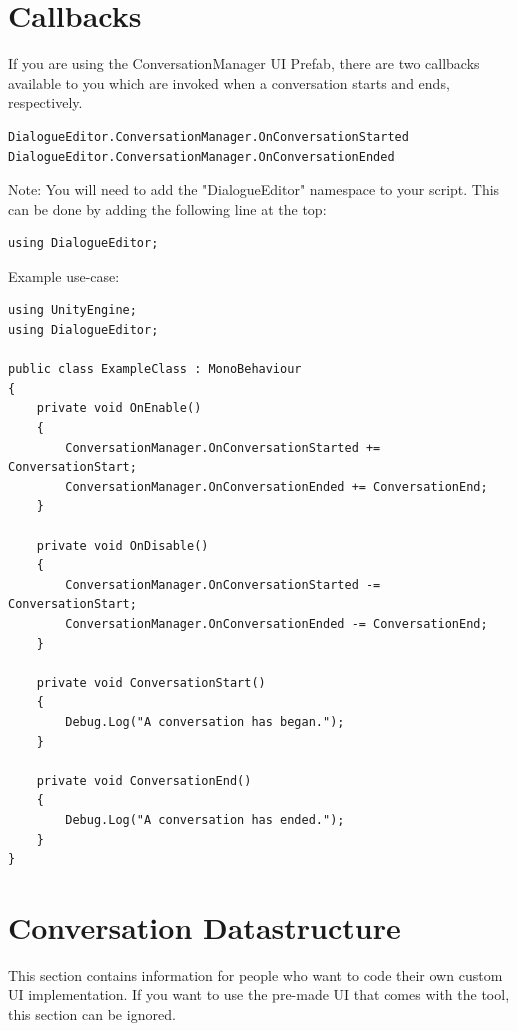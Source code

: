 \documentclass[a4paper,12pt]{article}
\begin{document}
\newpage





\hypertarget{_callbacks}{}
\section{Callbacks}

If you are using the ConversationManager UI Prefab, there are two callbacks available to you which are invoked when a conversation starts and ends, respectively.
\bigskip

\begin{lstlisting}
DialogueEditor.ConversationManager.OnConversationStarted
DialogueEditor.ConversationManager.OnConversationEnded
\end{lstlisting}
\bigskip

Note: You will need to add the "DialogueEditor" namespace to your script. This can be done by adding the following line at the top:
\bigskip

\begin{lstlisting}
using DialogueEditor;
\end{lstlisting}
\bigskip

Example use-case:
\bigskip

\begin{lstlisting}
using UnityEngine;
using DialogueEditor;

public class ExampleClass : MonoBehaviour
{
	private void OnEnable()
	{
		ConversationManager.OnConversationStarted += ConversationStart;
		ConversationManager.OnConversationEnded += ConversationEnd;
	}
	
	private void OnDisable()
	{
		ConversationManager.OnConversationStarted -= ConversationStart;
		ConversationManager.OnConversationEnded -= ConversationEnd;
	}
	
	private void ConversationStart()
	{
		Debug.Log("A conversation has began.");
	}
	
	private void ConversationEnd()
	{
		Debug.Log("A conversation has ended.");
	}
}
\end{lstlisting}

\newpage

\hypertarget{_datastructure}{}
\section{Conversation Datastructure}

This section contains information for people who want to code their own custom UI implementation. If you want to use the pre-made UI that comes with the tool, this section can be ignored.
\end{document}
